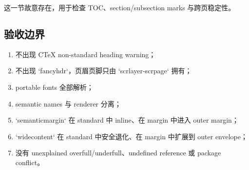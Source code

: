 这一节故意存在，用于检查 TOC、section/subsection marks 与跨页稳定性。

\subsection{验收边界}


\begin{enumerate}
  \item 不出现 CTeX non-standard heading warning；
  \item 不出现 `fancyhdr`，页眉页脚只由 `scrlayer-scrpage` 拥有；
  \item portable fonts 全部解析；
  \item semantic names 与 renderer 分离；
  \item `semanticmargin` 在 standard 中 inline、在 margin 中进入 outer margin；
  \item `widecontent` 在 standard 中安全退化、在 margin 中扩展到 outer envelope；
  \item 没有 unexplained overfull/underfull、undefined reference 或 package conflict。
\end{enumerate}
